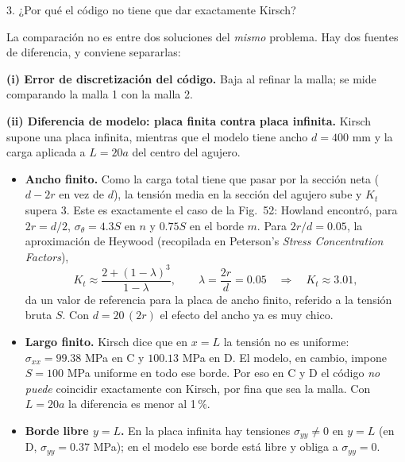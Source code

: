 \begin{desarrollo}{3. ¿Por qu\'e el c\'odigo no tiene que dar exactamente Kirsch?}

La comparaci\'on no es entre dos soluciones del \emph{mismo} problema. Hay dos
fuentes de diferencia, y conviene separarlas:

\textbf{(i) Error de discretizaci\'on del c\'odigo.} Baja al refinar la malla; se
mide comparando la malla 1 con la malla 2.

\textbf{(ii) Diferencia de modelo: placa finita contra placa infinita.} Kirsch
supone una placa infinita, mientras que el modelo tiene ancho $d=400$ mm y la
carga aplicada a $L=20a$ del centro del agujero.
\begin{itemize}[itemsep=3pt]
  \item \textbf{Ancho finito.} Como la carga total tiene que pasar por la
  secci\'on neta ($d-2r$ en vez de $d$), la tensi\'on media en la secci\'on del
  agujero sube y $K_t$ supera 3. Este es exactamente el caso de la Fig.~52:
  Howland encontr\'o, para $2r=d/2$, $\sigma_\theta=4.3S$ en $n$ y $0.75S$ en el
  borde $m$. Para $2r/d=0.05$, la aproximaci\'on de Heywood (recopilada en
  Peterson's \emph{Stress Concentration Factors}),
  \[
  K_t \approx \frac{2+(1-\lambda)^3}{1-\lambda},\qquad \lambda=\frac{2r}{d}=0.05
  \quad\Longrightarrow\quad K_t\approx3.01 ,
  \]
  da un valor de referencia para la placa de ancho finito, referido a la
  tensi\'on bruta $S$. Con $d=20\,(2r)$ el efecto del ancho ya es muy chico.
  \item \textbf{Largo finito.} Kirsch dice que en $x=L$ la tensi\'on no es
  uniforme: $\sigma_{xx}=99.38$ MPa en C y $100.13$ MPa en D. El modelo, en
  cambio, impone $S=100$ MPa uniforme en todo ese borde. Por eso en C y D el c\'odigo
  \emph{no puede} coincidir exactamente con Kirsch, por fina que sea la malla.
  Con $L=20a$ la diferencia es menor al 1\,\%.
  \item \textbf{Borde libre $y=L$.} En la placa infinita hay tensiones
  $\sigma_{yy}\ne0$ en $y=L$ (en D, $\sigma_{yy}=0.37$ MPa); en el modelo ese
  borde est\'a libre y obliga a $\sigma_{yy}=0$.
\end{itemize}


\end{desarrollo}
